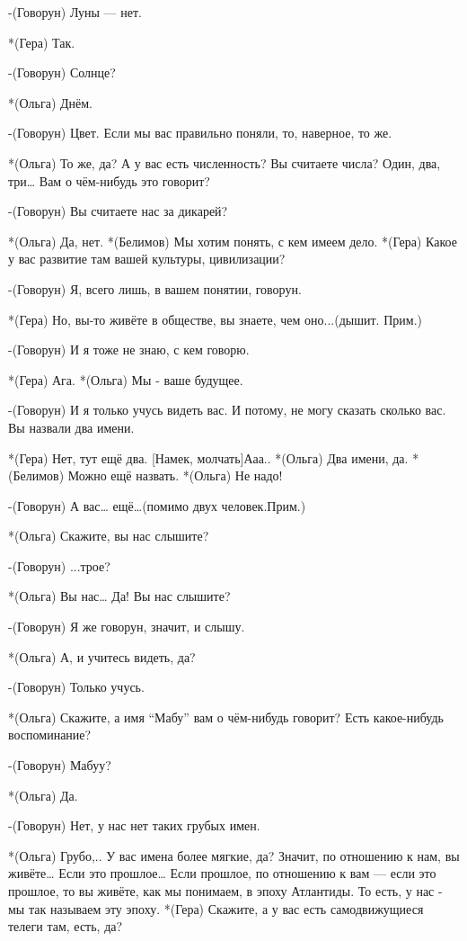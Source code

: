 -(Говорун) Луны — нет.

*(Гера) Так.

-(Говорун) Солнце? 

*(Ольга) Днём. 

-(Говорун) Цвет. Если мы вас правильно поняли, то, наверное, то же. 

*(Ольга) То же, да? А у вас есть численность? Вы считаете числа? Один, два, три… Вам о чём-нибудь это говорит?

-(Говорун) Вы считаете нас за дикарей?

*(Ольга) Да, нет.
*(Белимов) Мы хотим понять, с кем имеем дело. 
*(Гера) Какое у вас развитие там вашей культуры, цивилизации?

-(Говорун) Я, всего лишь, в вашем понятии, говорун.

*(Гера) Но, вы-то живёте в обществе, вы знаете, чем оно...(дышит. Прим.)

-(Говорун) И я тоже не знаю, с кем говорю.

*(Гера) Ага.
*(Ольга)  Мы - ваше будущее.

-(Говорун) И я только учусь видеть вас. И  потому, не могу сказать сколько вас. Вы назвали два имени.

*(Гера) Нет, тут ещё два. [Намек, молчать]Ааа..
*(Ольга) Два имени, да.
*(Белимов) Можно ещё назвать.
*(Ольга) Не надо!

-(Говорун) А вас… ещё…(помимо двух человек.Прим.)

*(Ольга) Скажите, вы нас слышите?

-(Говорун) ...трое?

*(Ольга) Вы нас… Да! Вы нас слышите?

-(Говорун) Я же говорун, значит, и слышу.

*(Ольга) А, и учитесь видеть, да?

-(Говорун) Только учусь.

*(Ольга) Скажите, а имя “Мабу” вам о чём-нибудь говорит? Есть какое-нибудь воспоминание?

-(Говорун) Мабуу?

*(Ольга) Да.

-(Говорун) Нет, у нас нет таких грубых имен.

*(Ольга) Грубо,.. У вас имена более мягкие, да? Значит, по отношению к нам, вы живёте… Если это прошлое… Если прошлое, по отношению к вам — если это прошлое, то вы живёте, как мы понимаем, в эпоху Атлантиды. То есть, у нас - мы так называем эту эпоху.
*(Гера) Скажите, а у вас есть самодвижущиеся телеги там, есть, да?

